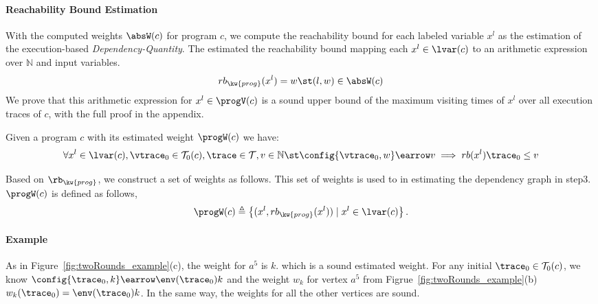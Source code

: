 \paragraph{Reachability Bound Estimation}
With the computed weights $\absW(c)$ for program $c$,
we compute the reachability bound for each labeled variable $x^l$ as the estimation of the 
execution-based \emph{Dependency-Quantity}. 
The estimated the reachability bound mapping each $x^l \in \lvar(c)$ to an arithmetic  expression over $\mathbb{N}$ and
input variables. 
\[ 
  rb_{\kw{prog}}(x^l) = w \st (l, w) \in \absW(c)
  \]
%
We prove that this 
arithmetic expression for $x^l \in \progV(c)$ is a sound upper bound of 
the maximum visiting times of $x^l$ over all execution traces of $c$, with the full proof in the appendix.
  \begin{thm}
    \label{thm:addweight_soundness}
  Given a program ${c}$ with its estimated weight $\progW(c)$
  we have:
  \[
  \forall x^l \in \lvar(c), \vtrace_0 \in \mathcal{T}_0(c), \trace \in \mathcal{T},
  v \in \mathbb{N}
   \st 
  \config{\vtrace_0, w} \earrow v
  \implies
  rb(x^l) \trace_0 \leq v
  \]
  \end{thm}
%
Based on $\rb_{\kw{prog}}$, we construct a set of weights as follows. 
This set of weights is used to in estimating the dependency graph in step3.
$\progW(c)$ is defined
as follows,
 \[\progW(c) \triangleq
  \left
  \{ (x^l,  rb_{\kw{prog}}(x^l)) \mid x^l \in \lvar(c) 
\right \}.
\]
\paragraph*{Example} 
As in
Figure~\ref{fig:twoRounds_example}(c),
the weight for $a^5$ is $k$. which is a sound estimated weight.
For any initial $\trace_0 \in \mathcal{T}_0(c)$, we know $\config{\trace_0, k} \earrow \env(\trace_0) k$ and
the weight $w_k$ for vertex $a^5$ from Figrue~\ref{fig:twoRounds_example}(b)
$w_k(\trace_0) = \env(\trace_0) k$. 
%
In the same way, the weights for all the other vertices are sound.
